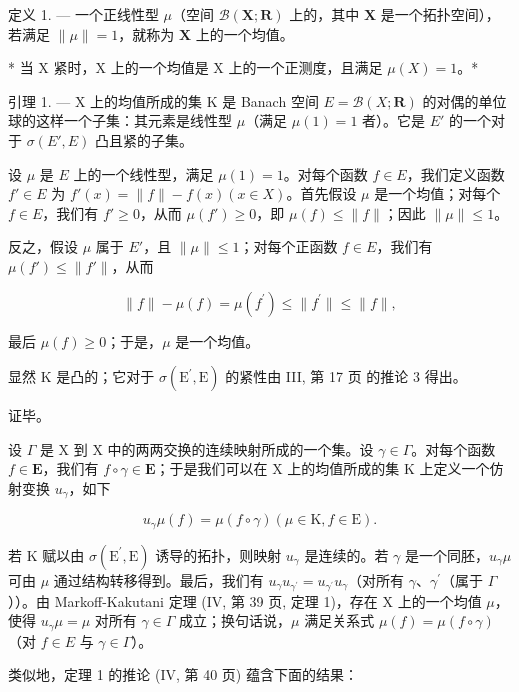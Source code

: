 定义 1. --- 一个正线性型 \(\mu\)（空间 \(\mathcal{B}(\mathbf{X};\mathbf{R})\) 上的，其中 \(\mathbf{X}\) 是一个拓扑空间），若满足 \(\|\mu\| = 1\)，就称为 \(\mathbf{X}\) 上的一个均值。

* 当 X 紧时，X 上的一个均值是 X 上的一个正测度，且满足 \(\mu(X)=1\)。*

引理 1. --- X 上的均值所成的集 K 是 Banach 空间 \(E = \mathcal{B}(X; \mathbf{R})\) 的对偶的单位球的这样一个子集：其元素是线性型 \(\mu\)（满足 \(\mu(1)=1\) 者）。它是 \(E'\) 的一个对于 \(\sigma(E', E)\) 凸且紧的子集。

设 \(\mu\) 是 \(E\) 上的一个线性型，满足 \(\mu(1) = 1\)。对每个函数 \(f \in E\)，我们定义函数 \(f' \in E\) 为 \(f'(x) = \| f \| - f(x) (x \in X)\)。首先假设 \(\mu\) 是一个均值；对每个 \(f \in E\)，我们有 \(f' \geqslant 0\)，从而 \(\mu(f') \geqslant 0\)，即 \(\mu(f) \leqslant \| f \|\)；因此 \(\|\mu\| \leqslant 1\)。

反之，假设 \(\mu\) 属于 \(E'\)，且 \(\| \mu \| \leqslant 1\)；对每个正函数 \(f \in E\)，我们有 \(\mu(f') \leqslant \| f'\|\)，从而

\[
\| f \| - \mu (f) = \mu \left(f ^ {\prime}\right) \leqslant \| f ^ {\prime} \| \leqslant \| f \|,
\]

最后 \(\mu(f) \geqslant 0\)；于是，\(\mu\) 是一个均值。

显然 K 是凸的；它对于 \(\sigma(\mathrm{E}^{\prime},\mathrm{E})\) 的紧性由 III, 第 17 页 的推论 3 得出。

证毕。

设 \(\Gamma\) 是 X 到 X 中的两两交换的连续映射所成的一个集。设 \(\gamma \in \Gamma\)。对每个函数 \(f \in \mathbf{E}\)，我们有 \(f \circ \gamma \in \mathbf{E}\)；于是我们可以在 X 上的均值所成的集 K 上定义一个仿射变换 \(u_{\gamma}\)，如下

\[
u _ {\gamma} \mu (f) = \mu (f \circ \gamma) (\mu \in \mathrm{K}, f \in \mathrm{E}).
\]

若 K 赋以由 \(\sigma(\mathrm{E}^{\prime},\mathrm{E})\) 诱导的拓扑，则映射 \(u_{\gamma}\) 是连续的。若 \(\gamma\) 是一个同胚，\(u_{\gamma}\mu\) 可由 \(\mu\) 通过结构转移得到。最后，我们有 \(u_{\gamma}u_{\gamma^{\prime}} = u_{\gamma^{\prime}}u_{\gamma}\)（对所有 \(\gamma\)、\(\gamma^{\prime}\)（属于 \(\Gamma\)））。由 Markoff-Kakutani 定理 (IV, 第 39 页, 定理 1)，存在 X 上的一个均值 \(\mu\)，使得 \(u_{\gamma}\mu = \mu\) 对所有 \(\gamma \in \Gamma\) 成立；换句话说，\(\mu\) 满足关系式 \(\mu(f) = \mu(f \circ \gamma)\)（对 \(f \in E\) 与 \(\gamma \in \Gamma\)）。

类似地，定理 1 的推论 (IV, 第 40 页) 蕴含下面的结果：

